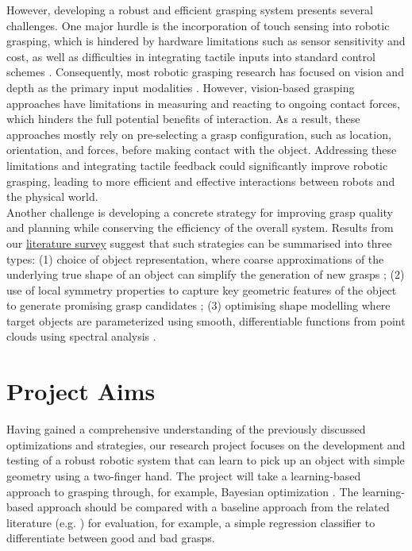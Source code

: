 \documentclass[11pt, a4paper]{report}
\begin{document}
However, developing a robust and efficient grasping system presents several challenges. One major hurdle is the incorporation of touch sensing into robotic grasping, which is hindered by hardware limitations such as sensor sensitivity and cost, as well as difficulties in integrating tactile inputs into standard control schemes \cite{Calandra_2018}. Consequently, most robotic grasping research has focused on vision and depth as the primary input modalities \cite{Calandra_2018}. However, vision-based grasping approaches have limitations in measuring and reacting to ongoing contact forces, which hinders the full potential benefits of interaction. As a result, these approaches mostly rely on pre-selecting a grasp configuration, such as location, orientation, and forces, before making contact with the object. Addressing these limitations and integrating tactile feedback could significantly improve robotic grasping, leading to more efficient and effective interactions between robots and the physical world.\\

Another challenge is developing a concrete strategy for improving grasp quality and planning while conserving the efficiency of the overall system. Results from our \hyperref[chap:2]{literature survey} suggest that such strategies can be summarised into three types: (1) choice of object representation, where coarse approximations of the underlying true shape of an object can simplify the generation of new grasps \cite{de_Farias_2021} \cite{geidenstam_2009}; (2) use of local symmetry properties to capture key geometric features of the object to generate promising grasp candidates \cite{de_Farias_2021}; (3) optimising shape modelling where target objects are parameterized using smooth, differentiable functions from point clouds using spectral analysis \cite{de_Farias_2021}.


\section{Project Aims}
\label{sec:1.2}
Having gained a comprehensive understanding of the previously discussed optimizations and strategies, our research project focuses on the development and testing of a robust robotic system that can learn to pick up an object with simple geometry using a two-finger hand. The project will take a learning-based approach to grasping through, for example, Bayesian optimization \cite{nogueira2016unscented, frazier2018tutorial}. The learning-based approach should be compared with a baseline approach from the related literature (e.g. \cite{nogueira2016unscented, danielczuk2020exploratory, breyer2020volumetric}) for evaluation, for example, a simple regression classifier to differentiate between good and bad grasps.
\end{document}

